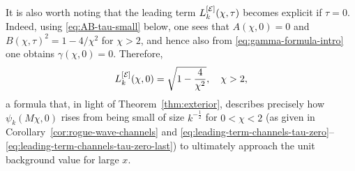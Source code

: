 It is also worth noting that the leading term $L_k^{[\mathcal{E}]}(\chi,\tau)$ becomes explicit if $\tau=0$.  Indeed, using \eqref{eq:AB-tau-small} below, one sees that $A(\chi,0)=0$ and $B(\chi,\tau)^2 = 1-4/\chi^2$ for $\chi>2$, and hence also from \eqref{eq:gamma-formula-intro} one obtains $\gamma(\chi,0)=0$.  Therefore,
\begin{equation}
L_k^{[\mathcal{E}]}(\chi,0)=\sqrt{1-\frac{4}{\chi^2}},\quad \chi>2,
\end{equation}
a formula that, in light of Theorem~\ref{thm:exterior}, describes precisely how $\psi_k(M\chi,0)$ rises from being small of size $k^{-\frac{1}{2}}$ for $0<\chi<2$ (as given in Corollary~\ref{cor:rogue-wave-channels} and \eqref{eq:leading-term-channels-tau-zero}--\eqref{eq:leading-term-channels-tau-zero-last}) to ultimately approach the unit background value for large $x$.

